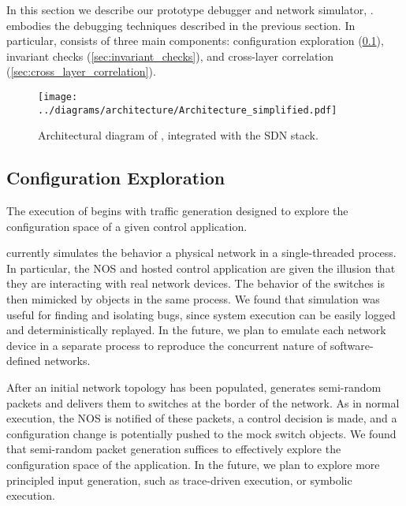 
In this section we describe our prototype debugger and network simulator, \projectname{}.
\projectname{} embodies the debugging techniques described in the previous section.
In particular, \projectname{} consists of three main components: configuration exploration
(\ref{sec:configuration_exploration}), invariant checks
(\ref{sec:invariant_checks}), and cross-layer correlation
(\ref{sec:cross_layer_correlation}).


\begin{figure}[t]
    \hspace{-10pt}
    \texttt{[image: ../diagrams/architecture/Architecture\_simplified.pdf]}
    \caption[]{\label{fig:basicarch} Architectural diagram of \projectname{}, integrated with the SDN stack.} 
\end{figure}

\subsection{Configuration Exploration}
\label{sec:configuration_exploration}

The execution of \projectname{} begins with traffic generation designed to explore the configuration
space of a given control application. 

\projectname{} currently simulates the behavior a physical network in a single-threaded process.
In particular, the NOS and hosted control application are given the illusion that
they are interacting with real network devices. The behavior of the
switches is then mimicked by objects in the same process. We found that
simulation was useful for finding and isolating bugs, since system execution
can be easily logged and deterministically replayed. In the future, we plan to
emulate each network device in a separate process to reproduce the concurrent
nature of software-defined networks.

After an initial network topology has been populated, \projectname{}
generates semi-random packets and delivers them to switches at the border of
the network. As in normal execution, the NOS is notified of these packets, a
control decision is made, and a configuration change is potentially pushed 
to the mock switch objects. We found
that semi-random packet generation suffices to effectively explore the
configuration space of the application. In the future, we plan to explore more
principled input generation, such as trace-driven execution, or symbolic
execution. 

